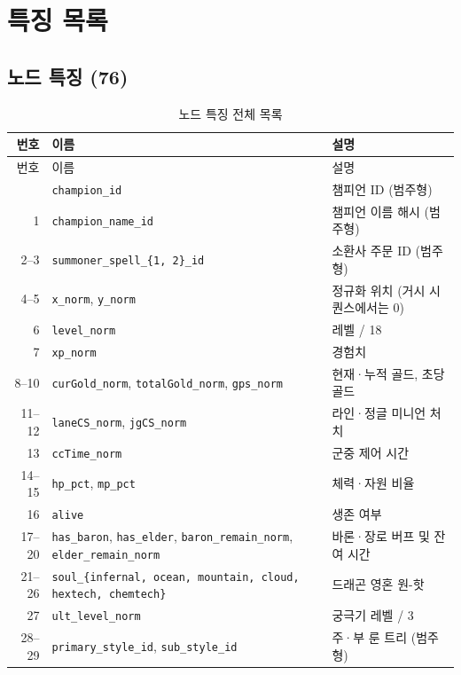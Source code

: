 \chapter{특징 목록}
\label{app:features}

\section{노드 특징 (76)}

\begin{longtable}{@{}r>{\raggedright\arraybackslash}p{6.0cm}>{\raggedright\arraybackslash}p{6.7cm}@{}}
  \caption{노드 특징 전체 목록}\label{tab:app-node}\\
  \toprule
  번호 & 이름 & 설명 \\
  \midrule
  \endfirsthead
  \toprule
  번호 & 이름 & 설명 \\
  \midrule
  \endhead
  \bottomrule
  \endfoot
  0 & \texttt{champion\_id} & 챔피언 ID (범주형) \\
  1 & \texttt{champion\_name\_id} & 챔피언 이름 해시 (범주형) \\
  2--3 & \texttt{summoner\_spell\_\{1, 2\}\_id} & 소환사 주문 ID (범주형) \\
  4--5 & \texttt{x\_norm}, \texttt{y\_norm} & 정규화 위치 (거시 시퀀스에서는 0) \\
  6 & \texttt{level\_norm} & 레벨 / 18 \\
  7 & \texttt{xp\_norm} & 경험치 \\
  8--10 & \texttt{curGold\_norm}, \texttt{totalGold\_norm}, \texttt{gps\_norm} & 현재·누적 골드, 초당 골드 \\
  11--12 & \texttt{laneCS\_norm}, \texttt{jgCS\_norm} & 라인·정글 미니언 처치 \\
  13 & \texttt{ccTime\_norm} & 군중 제어 시간 \\
  14--15 & \texttt{hp\_pct}, \texttt{mp\_pct} & 체력·자원 비율 \\
  16 & \texttt{alive} & 생존 여부 \\
  17--20 & \texttt{has\_baron}, \texttt{has\_elder}, \texttt{baron\_remain\_norm}, \texttt{elder\_remain\_norm} & 바론·장로 버프 및 잔여 시간 \\
  21--26 & \texttt{soul\_\{infernal, ocean, mountain, cloud, hextech, chemtech\}} & 드래곤 영혼 원-핫 \\
  27 & \texttt{ult\_level\_norm} & 궁극기 레벨 / 3 \\
  28--29 & \texttt{primary\_style\_id}, \texttt{sub\_style\_id} & 주·부 룬 트리 (범주형) \\

\end{longtable}
